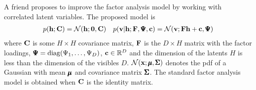 %




\label{ex:FA}

A friend proposes to improve the factor analysis model by
working with correlated latent variables. The proposed model is
\begin{align}
  p(\mathbf{h}; \mathbf{C}) &= \mathcal{N}(\mathbf{h}; \boldsymbol{0}, \mathbf{C}) & p(\mathbf{v} | \mathbf{h}; \mathbf{F}, \pmb{\Psi}, \mathbf{c}) = \mathcal{N}(\mathbf{v}; \mathbf{F} \mathbf{h}+\mathbf{c}, \pmb{\Psi})
\end{align}
where $\mathbf{C}$ is some $H \times H$ covariance matrix, $\mathbf{F}$ is the $D
\times H$ matrix with the factor loadings, $\pmb{\Psi}=\operatorname{diag}(\Psi_1,
\ldots, \Psi_D)$, $\mathbf{c}\in \mathbb{R}^D$ and the dimension of the
latents $H$ is less than the dimension of the visibles
$D$. $\mathcal{N}(\mathbf{x}; \pmb{\mu}, \pmb{\Sigma})$ denotes the pdf of a Gaussian with
mean $\pmb{\mu}$ and covariance matrix $\pmb{\Sigma}$. The standard factor analysis model is obtained when $\mathbf{C}$ is the identity matrix.

